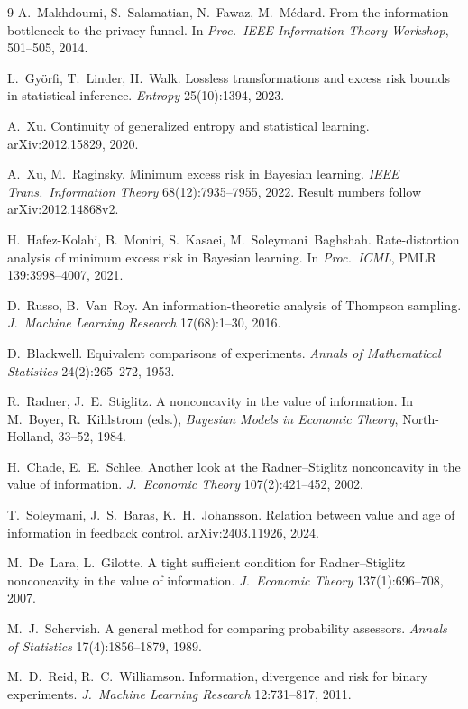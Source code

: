 \documentclass[acmsmall,screen,review,anonymous]{acmart}
\begin{document}
\begin{thebibliography}{9}
A.~Makhdoumi, S.~Salamatian, N.~Fawaz, M.~M\'edard. From the information
bottleneck to the privacy funnel. In \emph{Proc.\ IEEE Information
Theory Workshop}, 501--505, 2014.

L.~Gy\"orfi, T.~Linder, H.~Walk. Lossless transformations and excess
risk bounds in statistical inference. \emph{Entropy} 25(10):1394, 2023.

A.~Xu. Continuity of generalized entropy and statistical learning.
arXiv:2012.15829, 2020.

A.~Xu, M.~Raginsky. Minimum excess risk in Bayesian learning.
\emph{IEEE Trans.\ Information Theory} 68(12):7935--7955, 2022.
Result numbers follow arXiv:2012.14868v2.

H.~Hafez-Kolahi, B.~Moniri, S.~Kasaei, M.~Soleymani~Baghshah.
Rate-distortion analysis of minimum excess risk in Bayesian learning.
In \emph{Proc.\ ICML}, PMLR 139:3998--4007, 2021.

D.~Russo, B.~Van~Roy. An information-theoretic analysis of Thompson
sampling. \emph{J.\ Machine Learning Research} 17(68):1--30, 2016.

D.~Blackwell. Equivalent comparisons of experiments.
\emph{Annals of Mathematical Statistics} 24(2):265--272, 1953.

R.~Radner, J.~E.~Stiglitz. A nonconcavity in the value of information. In
M.~Boyer, R.~Kihlstrom (eds.), \emph{Bayesian Models in Economic Theory},
North-Holland, 33--52, 1984.

H.~Chade, E.~E.~Schlee. Another look at the Radner--Stiglitz nonconcavity
in the value of information.
\emph{J.~Economic Theory} 107(2):421--452, 2002.

T.~Soleymani, J.~S.~Baras, K.~H.~Johansson. Relation between value and
age of information in feedback control. arXiv:2403.11926, 2024.

M.~De~Lara, L.~Gilotte. A tight sufficient condition for
Radner--Stiglitz nonconcavity in the value of information.
\emph{J.~Economic Theory} 137(1):696--708, 2007.

M.~J.~Schervish. A general method for comparing probability assessors.
\emph{Annals of Statistics} 17(4):1856--1879, 1989.

M.~D.~Reid, R.~C.~Williamson. Information, divergence and risk for binary
experiments. \emph{J.~Machine Learning Research} 12:731--817, 2011.


\end{thebibliography}
\end{document}
